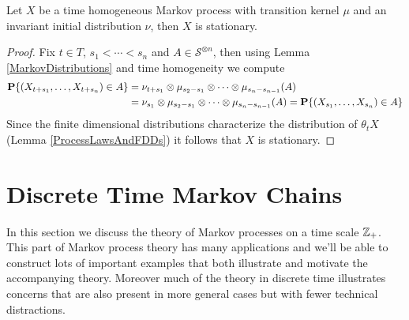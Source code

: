 \begin{lem}\label{InvarianceImpliesStationary}Let $X$ be a time
  homogeneous Markov process with transition kernel $\mu$ and an invariant initial distribution
  $\nu$, then $X$ is stationary.
\end{lem}
\begin{proof}
Fix $t \in T$, $s_1 < \dotsb < s_n$ and $A \in \mathcal{S}^{\otimes
  n}$, then using Lemma
\ref{MarkovDistributions} and time homogeneity we compute
\begin{align*}
\textbf{P}\{(X_{t + s_1}, \dotsc, X_{t + s_n}) \in A\} &= \nu_{t+s_1}
                                                         \otimes
                                                         \mu_{s_2 -
                                                         s_1} \otimes
                                                         \dotsm
                                                         \otimes
                                                         \mu_{s_n -
                                                         s_{n-1}}(A)
  \\
&=\nu_{s_1}
                                                         \otimes
                                                         \mu_{s_2 -
                                                         s_1} \otimes
                                                         \dotsm
                                                         \otimes
                                                         \mu_{s_n -
                                                         s_{n-1}}(A)
= \textbf{P}\{(X_{ s_1}, \dotsc, X_{s_n}) \in A\}
\end{align*}
Since the finite dimensional distributions characterize the
distribution of $\theta_t X$ (Lemma \ref{ProcessLawsAndFDDs}) it follows that $X$ is stationary.
\end{proof}


\section{Discrete Time Markov Chains}

In this section we discuss the theory of Markov processes on a time
scale $\mathbb{Z}_+$.  This part of Markov process theory has many
applications and we'll be able to construct lots of important examples
that both illustrate and motivate the accompanying theory.  Moreover
much of the theory in discrete time illustrates concerns that are also
present in more general cases but with fewer technical distractions.

